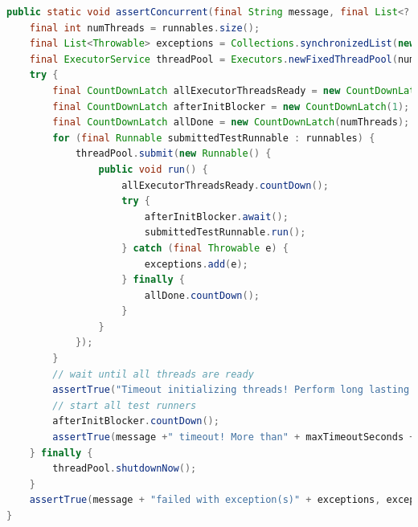 \documentclass[11pt,a4paper]{book}
\begin{document}
\begin{lstlisting}[language = Java]
public static void assertConcurrent(final String message, final List<? extends Runnable> runnables, final int maxTimeoutSeconds) throws InterruptedException {
    final int numThreads = runnables.size();
    final List<Throwable> exceptions = Collections.synchronizedList(new ArrayList<Throwable>());
    final ExecutorService threadPool = Executors.newFixedThreadPool(numThreads);
    try {
        final CountDownLatch allExecutorThreadsReady = new CountDownLatch(numThreads);
        final CountDownLatch afterInitBlocker = new CountDownLatch(1);
        final CountDownLatch allDone = new CountDownLatch(numThreads);
        for (final Runnable submittedTestRunnable : runnables) {
            threadPool.submit(new Runnable() {
                public void run() {
                    allExecutorThreadsReady.countDown();
                    try {
                        afterInitBlocker.await();
                        submittedTestRunnable.run();
                    } catch (final Throwable e) {
                        exceptions.add(e);
                    } finally {
                        allDone.countDown();
                    }
                }
            });
        }
        // wait until all threads are ready
        assertTrue("Timeout initializing threads! Perform long lasting initializations before passing runnables to assertConcurrent", allExecutorThreadsReady.await(runnables.size() * 10, TimeUnit.MILLISECONDS));
        // start all test runners
        afterInitBlocker.countDown();
        assertTrue(message +" timeout! More than" + maxTimeoutSeconds + "seconds", allDone.await(maxTimeoutSeconds, TimeUnit.SECONDS));
    } finally {
        threadPool.shutdownNow();
    }
    assertTrue(message + "failed with exception(s)" + exceptions, exceptions.isEmpty());
}
\end{lstlisting}
\end{document}
